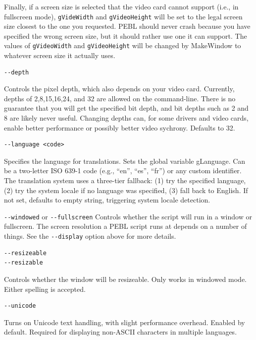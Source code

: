 \begin{description}
Finally, if a screen size is selected that the video card cannot
support (i.e., in fullscreen mode), \texttt{gVideWidth} and \texttt{gVideoHeight} will
be set to the legal screen size closest to the one you requested.  PEBL should never crash because 
you have specified the wrong screen size, but it should rather use one it can support.  The values of 
\texttt{gVideoWidth} and \texttt{gVideoHeight} will be changed by MakeWindow to whatever screen size it actually uses.

\item
\begin{verbatim}
--depth
\end{verbatim}
  Controls the pixel depth, which also  depends on your video card.
  Currently, depths of 2,8,15,16,24, and 32 are allowed on the
  command-line.  There is no guarantee that you will get the
  specified bit depth, and bit depths such as 2 and 8 are
  likely never useful.  Changing depths can, for
  some drivers and video cards, enable better performance or
  possibly better video sychrony.  Defaults to 32.

\item
\begin{verbatim}
--language <code>
\end{verbatim}
  Specifies the language for translations. Sets the global variable gLanguage.
  Can be a two-letter ISO 639-1 code (e.g., ``en'', ``es'', ``fr'') or any
  custom identifier. The translation system uses a three-tier fallback:
  (1) try the specified language, (2) try the system locale if no language
  was specified, (3) fall back to English. If not set, defaults to empty
  string, triggering system locale detection.

\item
\verb+--windowed+ or \verb+--fullscreen+
Controls whether the script will run in a window or fullscreen.
The screen resolution a PEBL script runs at depends on a number of things.  See the \verb+--display+ option above for more details.

\item
\begin{verbatim}
--resizeable
--resizable
\end{verbatim}
  Controls whether the window will be resizeable. Only works in windowed mode.
  Either spelling is accepted.

\item
\begin{verbatim}
--unicode
\end{verbatim}
  Turns on Unicode text handling, with slight performance overhead. Enabled by default.
  Required for displaying non-ASCII characters in multiple languages.


\end{description}
